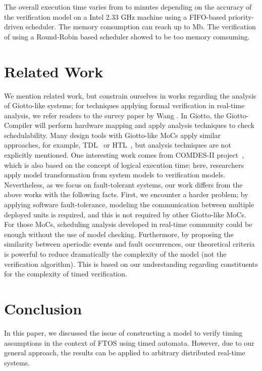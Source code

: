 \documentclass[10pt, a4paper, onecolumn, conference, compsocconf]{IEEEtran}
\begin{document}
The overall execution time varies from  to  minutes depending on the accuracy of the verification model on a Intel 2.33 GHz machine using a FIFO-based priority-driven scheduler. The  memory consumption can reach up to Mb. The verification of using a Round-Robin based scheduler showed to be too memory comsuming.

\section{Related Work\label{sec.Related.Work}}
We mention related work, but constrain ourselves in works regarding the analysis of Giotto-like systems; for techniques applying formal verification
in real-time analysis, we refer readers to the survey paper by Wang \cite{wang2004fvt}.
In Giotto, the Giotto-Compiler will perform hardware mapping and apply analysis techniques to check schedulability.
Many design tools with Giotto-like MoCs apply similar approaches, for example, TDL~\cite{simmons:1998:tdl} or HTL~\cite{ghosal:2006:htl}, but
analysis techniques are not explicitly mentioned.
One interesting work comes from COMDES-II project~\cite{ke2008vci}, which is also based on the concept of logical execution time; here, researchers apply model transformation from system models to verification models.
Nevertheless, as we focus on fault-tolerant systems, our work differs from the above works with the following facts.
First, we encounter a harder problem; by applying software fault-tolerance, modeling the communication between multiple deployed
units is required, and this is not required by other Giotto-like MoCs.
For those MoCs, scheduling analysis developed in real-time community could be enough without the use of model checking.
Furthermore, by proposing the similarity between aperiodic events and fault occurrences, our theoretical criteria is powerful to
reduce dramatically the complexity of the model (not the verification algorithm). This is based on our understanding regarding constituents
for the complexity of timed verification.

\section{Conclusion\label{sec.Conclusion}}

In this paper, we discussed the issue of constructing a model to verify timing assumptions in the context of FTOS using timed automata. However, due to our general approach, the results can be applied to arbitrary distributed real-time systems.
\end{document}
